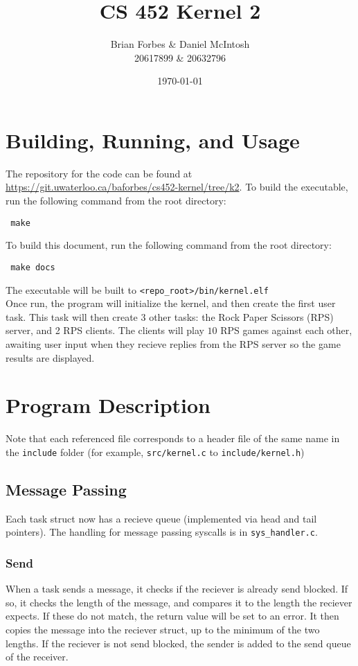 \documentclass{article}
\begin{document}
\title{CS 452 Kernel 2}
\author{Brian Forbes \& Daniel McIntosh \\ 20617899 \& 20632796}
\date{\today}

\maketitle

\section{Building, Running, and Usage}

The repository for the code can be found at \url{https://git.uwaterloo.ca/baforbes/cs452-kernel/tree/k2}.
To build the executable, run the following command from the root directory: \begin{verbatim} make \end{verbatim}
To build this document, run the following command from the root directory: \begin{verbatim} make docs \end{verbatim}
The executable will be built to \verb|<repo_root>/bin/kernel.elf|\\

Once run, the program will initialize the kernel, and then create the first user task. This task will then create 3 other tasks: the Rock Paper Scissors (RPS) server, and 2 RPS clients. The clients will play $10$ RPS games against each other, awaiting user input when they recieve replies from the RPS server so the game results are displayed.

\section{Program Description}
Note that each referenced file corresponds to a header file of the same name in the \verb|include| folder (for example, \verb|src/kernel.c| to \verb|include/kernel.h|)
\subsection{Message Passing}
Each task struct now has a recieve queue (implemented via head and tail pointers). The handling for message passing syscalls is in \verb|sys_handler.c|.
\subsubsection{Send}
    When a task sends a message, it checks if the reciever is already send blocked. If so, it checks the length of the message, and compares it to the length the reciever expects. If these do not match, the return value will be set to an error. It then copies the message into the reciever struct, up to the minimum of the two lengths.
    If the reciever is not send blocked, the sender is added to the send queue of the receiver.
\end{document}

